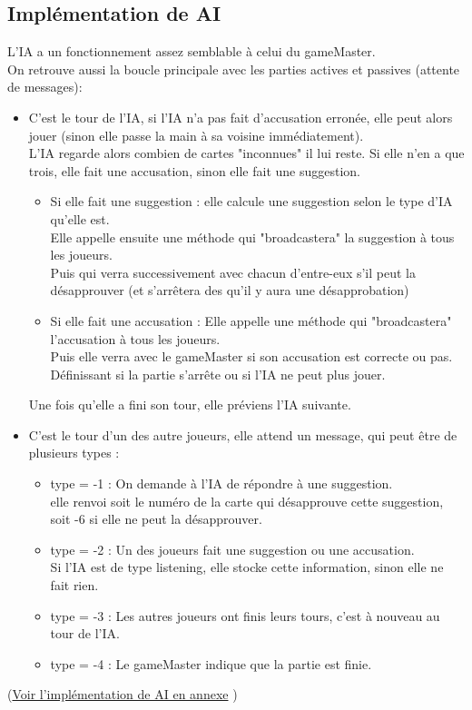\documentclass[a4paper,10pt]{article}
\begin{document}
	\subsection{Implémentation de AI}
	L'IA a un fonctionnement assez semblable à celui du gameMaster.\\
	On retrouve aussi la boucle principale avec les parties actives et passives (attente de messages):
		\begin{itemize}
			\item C'est le tour de l'IA, si l'IA n'a pas fait d'accusation erronée, elle peut alors jouer (sinon elle passe la main à sa voisine immédiatement).\\
				L'IA regarde alors combien de cartes "inconnues" il lui reste. Si elle n'en a que trois, elle fait une accusation, sinon elle fait une suggestion.
				\begin{itemize}
					\item Si elle fait une suggestion : elle calcule une suggestion selon le type d'IA qu'elle est.\\
						Elle appelle ensuite une méthode qui "broadcastera" la suggestion à tous les joueurs.\\
						 Puis qui verra successivement avec chacun d'entre-eux s'il peut la désapprouver (et s'arrêtera des qu'il y aura une désapprobation)
					\item Si elle fait une accusation : Elle appelle une méthode qui "broadcastera" l'accusation à tous les joueurs.\\
						 Puis elle verra avec le gameMaster si son accusation est correcte ou pas. Définissant si la partie s'arrête ou si l'IA ne peut plus jouer.
				\end{itemize}
				Une fois qu'elle a fini son tour, elle préviens l'IA suivante.
			\item C'est le tour d'un des autre joueurs, elle attend un message, qui peut être de plusieurs types :
				\begin{itemize}
					\item type = -1 : On demande à l'IA de répondre à une suggestion.\\
								elle renvoi soit le numéro de la carte qui désapprouve cette suggestion, soit -6 si elle ne peut la désapprouver.
					\item type = -2 : Un des joueurs fait une suggestion ou une accusation.\\
								Si l'IA est de type listening, elle stocke cette information, sinon elle ne fait rien.
					\item type = -3 : Les autres joueurs ont finis leurs tours, c'est à nouveau au tour de l'IA.
					\item type = -4 : Le gameMaster indique que la partie est finie.
				\end{itemize}
		\end{itemize}
	(\hyperlink{AIimplementation}{Voir l'implémentation de AI en annexe} )
	
\end{document}
